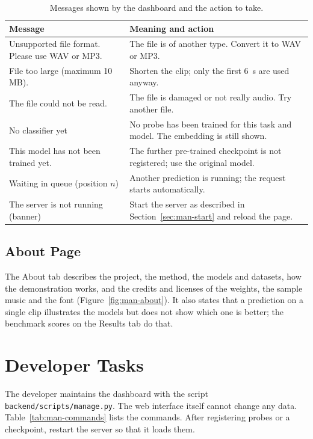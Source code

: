 \begin{table}[htbp]
\centering
\caption[Messages shown by the dashboard]{Messages shown by the dashboard and the action to take.}
\label{tab:man-messages}
\small\singlespacing
\begin{tabularx}{\linewidth}{>{\raggedright\arraybackslash}p{5.6cm}Y}
\toprule
\textbf{Message} & \textbf{Meaning and action}\\
\midrule
Unsupported file format. Please use WAV or MP3. & The file is of another type. Convert it to WAV or MP3.\\
File too large (maximum 10 MB). & Shorten the clip; only the first 6~s are used anyway.\\
The file could not be read. & The file is damaged or not really audio. Try another file.\\
No classifier yet & No probe has been trained for this task and model. The embedding is still shown.\\
This model has not been trained yet. & The further pre-trained checkpoint is not registered; use the original model.\\
Waiting in queue (position $n$) & Another prediction is running; the request starts automatically.\\
The server is not running (banner) & Start the server as described in Section~\ref{sec:man-start} and reload the page.\\
\bottomrule
\end{tabularx}
\end{table}

\subsection{About Page}
The About tab describes the project, the method, the models and datasets, how the demonstration works, and the credits and licenses of the weights, the sample music and the font (Figure~\ref{fig:man-about}). It also states that a prediction on a single clip illustrates the models but does not show which one is better; the benchmark scores on the Results tab do that.

\section{Developer Tasks}
\label{sec:man-dev}
The developer maintains the dashboard with the script \texttt{backend/scripts/manage.py}. The web interface itself cannot change any data. Table~\ref{tab:man-commands} lists the commands. After registering probes or a checkpoint, restart the server so that it loads them.

